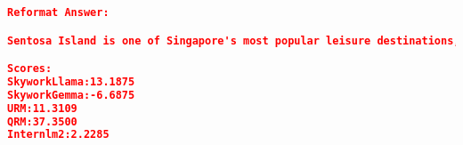 \begin{lstlisting}[language=json,numbers=none]
Reformat Answer:

Sentosa Island is one of Singapore's most popular leisure destinations, offering a variety of attractions and activities that cater to all ages. The island boasts several beautiful beaches, such as Siloso Beach, Palawan Beach, and Tanjong Beach, which are great for sunbathing, swimming, beach volleyball, or simply relaxing. Universal Studios Singapore, a Hollywood movie theme park, is one of the island's biggest draws, featuring rides and attractions based on popular films and TV shows. The S.E.A. Aquarium, one of the world's largest aquariums, showcases more than 100,000 marine

Scores:
SkyworkLlama:13.1875
SkyworkGemma:-6.6875
URM:11.3109
QRM:37.3500
Internlm2:2.2285
\end{lstlisting}